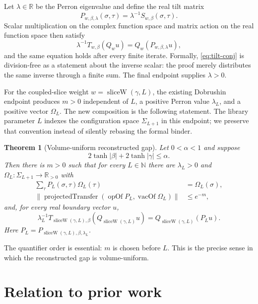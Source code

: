 \documentclass[11pt]{article}
\newtheorem{theorem}{Theorem}[section]
\newcommand{\R}{\mathbb R}
\newcommand{\N}{\mathbb N}
\begin{document}
Let $\lambda\in\R$ be the Perron eigenvalue and define the real tilt matrix
\begin{equation}\label{eq:tilt}
  P_{w,\beta,\lambda}(\sigma,\tau)
   =\lambda^{-1}S_{w,\beta}(\sigma,\tau).
\end{equation}
Scalar multiplication on the complex function space and matrix action on the
real function space then satisfy
\begin{equation}\label{eq:tilt-conj}
  \lambda^{-1}T_{w,\beta}(Q_wu)
   =Q_w(P_{w,\beta,\lambda}u),
\end{equation}
and the same equation holds after every finite iterate.  Formally,
\eqref{eq:tilt-conj} is division-free as a statement about the inverse scalar:
the proof merely distributes the same inverse through a finite sum.  The final
endpoint supplies $\lambda>0$.

For the coupled-slice weight $w=\operatorname{sliceW}(\gamma,L)$, the existing
Dobrushin endpoint produces $m>0$ independent of $L$, a positive Perron value
$\lambda_L$, and a positive vector $\Omega_L$.  The new composition is the
following statement.  The library parameter $L$ indexes the configuration
space $\Sigma_{L+1}$ in this endpoint; we preserve that convention instead of
silently rebasing the formal binder.

\begin{theorem}[Volume-uniform reconstructed gap]
Let $0<\alpha<1$ and suppose
\[
  2\tanh|\beta|+2\tanh|\gamma|\leq\alpha.
\]
Then there is $m>0$ such that for every $L\in\N$ there are
$\lambda_L>0$ and $\Omega_L:\Sigma_{L+1}\to\R_{>0}$ with
\begin{align*}
  \sum_\tau P_L(\sigma,\tau)\Omega_L(\tau)&=\Omega_L(\sigma),\\
  \bigl\|\operatorname{projectedTransfer}(\operatorname{opOf}P_L,
       \operatorname{vacOf}\Omega_L)\bigr\|&\leq e^{-m},
\end{align*}
and, for every real boundary vector $u$,
\[
  \lambda_L^{-1}T_{\operatorname{sliceW}(\gamma,L),\beta}
       (Q_{\operatorname{sliceW}(\gamma,L)}u)
  =Q_{\operatorname{sliceW}(\gamma,L)}(P_Lu).
\]
Here $P_L=P_{\operatorname{sliceW}(\gamma,L),\beta,\lambda_L}$.
\end{theorem}

The quantifier order is essential: $m$ is chosen before $L$.  This is the
precise sense in which the reconstructed gap is volume-uniform.

\section{Relation to prior work}
\end{document}
